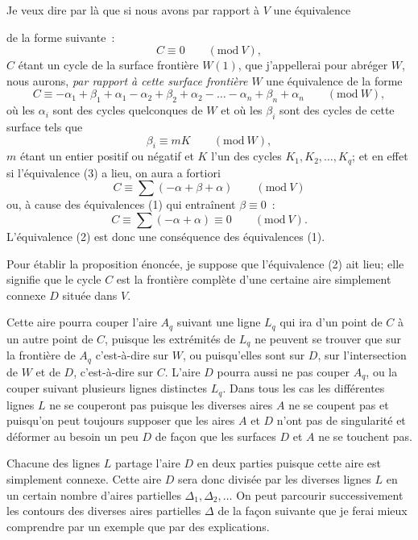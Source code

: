 \documentclass{article}
\begin{document}
Je veux dire par là que si nous avons par rapport à $V$ une équivalence

de la forme suivante~:
\[ C \equiv 0 \qquad (\text{mod}\ V), \tag{2} \]
$C$ étant un cycle de la surface frontière $W(1)$, que j'appellerai pour abréger $W$, nous aurons, \emph{par rapport à cette surface frontière $W$} une équivalence de la forme
\[ C \equiv -\alpha_{1} + \beta_{1} + \alpha_{1} - \alpha_{2} + \beta_{2} + \alpha_{2} - \ldots - \alpha_{n} + \beta_{n} + \alpha_{n} \qquad (\text{mod}\ W), \tag{3} \]
où les $\alpha_{i}$ sont des cycles quelconques de $W$ et où les $\beta_{i}$ sont des cycles de cette surface tels que
\[ \beta_{i} \equiv mK \qquad (\text{mod}\ W), \]
$m$ étant un entier positif ou négatif et $K$ l'un des cycles $K_{1}, K_{2}, \ldots, K_{q}$; et en effet si l'équivalence (3) a lieu, on aura a fortiori
\[ C \equiv \sum (-\alpha + \beta + \alpha) \qquad (\text{mod}\ V) \]
ou, à cause des équivalences (1) qui entraînent $\beta \equiv 0$~:
\[ C \equiv \sum (-\alpha + \alpha) \equiv 0 \qquad (\text{mod}\ V). \]
L'équivalence (2) est donc une conséquence des équivalences (1).

Pour établir la proposition énoncée, je suppose que l'équivalence (2) ait lieu; elle signifie que le cycle $C$ est la frontière complète d'une certaine aire simplement connexe $D$ située dans $V$.

Cette aire pourra couper l'aire $A_{q}$ suivant une ligne $L_{q}$ qui ira d'un point de $C$ à un autre point de $C$, puisque les extrémités de $L_{q}$ ne peuvent se trouver que sur la frontière de $A_{q}$ c'est-à-dire sur $W$, ou puisqu'elles sont sur $D$, sur l'intersection de $W$ et de $D$, c'est-à-dire sur $C$. L'aire $D$ pourra aussi ne pas couper $A_{q}$, ou la couper suivant plusieurs lignes distinctes $L_{q}$. Dans tous les cas les différentes lignes $L$ ne se couperont pas puisque les diverses aires $A$ ne se coupent pas et puisqu'on peut toujours supposer que les aires $A$ et $D$ n'ont pas de singularité et déformer au besoin un peu $D$ de façon que les surfaces $D$ et $A$ ne se touchent pas.

Chacune des lignes $L$ partage l'aire $D$ en deux parties puisque cette aire est simplement connexe. Cette aire $D$ sera donc divisée par les diverses lignes $L$ en un certain nombre d'aires partielles $\Delta_{1}, \Delta_{2}, \ldots$ On peut parcourir successivement les contours des diverses aires partielles $\Delta$ de la façon suivante que je ferai mieux comprendre par un exemple que par des explications.
\end{document}
